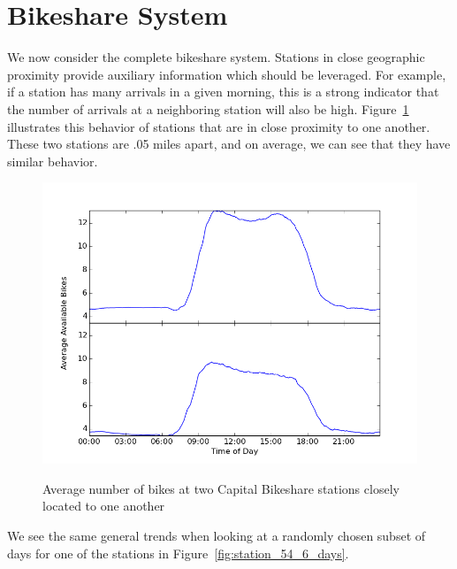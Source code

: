 \documentclass{acm_proc_article-sp}
\begin{document}
\section{Bikeshare System}

We now consider the complete bikeshare system.  Stations in close geographic proximity provide auxiliary information which should be leveraged.  For example, if a station has many arrivals in a given morning, this is a strong indicator that the number of arrivals at a neighboring station will also be high. Figure~\ref{fig:stations_54_106_ave}  illustrates this behavior of stations that are in close proximity to one another. These two stations are .05 miles apart, and on average, we can see that they have similar behavior.
\begin{figure} [!h]
\caption{Average number of bikes at two Capital Bikeshare stations closely located to one another}
\centering
\includegraphics[scale = 0.4]{stations_54_106_ave.png}
\label{fig:stations_54_106_ave}
\end{figure}
We see the same general trends when looking at a randomly chosen subset of days for one of the stations in Figure~\ref{fig:station_54_6_days}.
\end{document}
